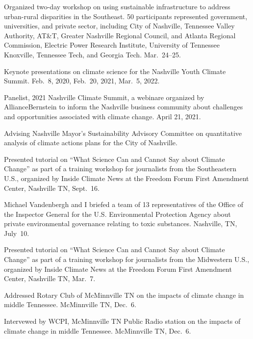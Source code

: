 \item[2022] Organized two-day workshop on using sustainable infrastructure to
  address urban-rural disparities in the Southeast. 50 participants represented
  government, universities, and private sector, including City of Nashville,
  Tennessee Valley Authority, AT\&T, Greater Nashville Regional Council,
  and Atlanta Regional Commission, Electric Power Research Institute,
  University of Tennessee Knoxville, Tennessee Tech, and Georgia Tech.
  Mar.~24--25.
\item[2020--2022] Keynote presentations on climate science for the Nashville
Youth Climate Summit. Feb.~8, 2020, Feb.~20, 2021, Mar.~5, 2022.
\item[2021] Panelist, 2021 Nashville Climate Summit, a webinare organized by
 AllianceBernstein to inform the Nashville business community about
 challenges and opportunities associated with climate change. April 21, 2021.
\item[2020--present] Advising Nashville Mayor's Sustainability Advisory
  Committee on quantitative analysis of climate actions plans for the City of
  Nashville.
\item[2019] Presented tutorial on ``What Science Can and Cannot Say about
  Climate Change'' as part of a training workshop for journalists from the
  Southeastern U.S., organized by Inside Climate News at the Freedom Forum
  First Amendment Center, Nashville TN, Sept.~16.
\item[2019] Michael Vandenbergh and I briefed a team of 13 representatives of
  the Office of the Inspector General for the U.S. Environmental Protection
  Agency about private environmental governance relating to toxic substances.
  Nashville, TN, July~10.
\item[2019] Presented tutorial on ``What Science Can and Cannot Say about
  Climate Change'' as part of a training workshop for journalists from the
  Midwestern U.S., organized by Inside Climate News at the Freedom Forum First
  Amendment Center, Nashville TN, Mar.~7.
\item[2018] Addressed Rotary Club of McMinnville TN on the impacts of climate
  change in middle Tennessee. McMinnville TN, Dec.\ 6.
\item[2018] Intervewed by WCPI, McMinnville TN Public Radio station on the
  impacts of climate change in middle Tennessee. McMinnville TN, Dec.\ 6.
